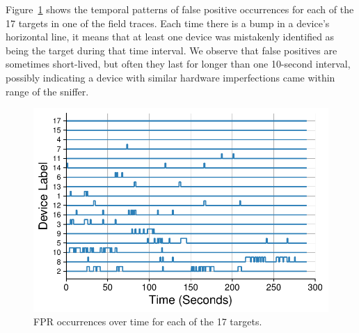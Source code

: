 Figure~\ref{fig:fpr_time} shows the temporal patterns of false positive
occurrences for each of the 17 targets in one of the field traces. Each time
there is a bump in a device's horizontal line, it means that at least one
device was mistakenly identified as being the target during that time interval.
We observe that false positives are sometimes short-lived, but often they last
for longer than one 10-second interval, possibly indicating a device with
similar hardware imperfections came within range of the
sniffer. 




\begin{figure}[t!]
    \centering
    \includegraphics[width = \linewidth]{bletracking/plots/fpr_time_10sec_sort2.pdf} 
    \caption{FPR occurrences over time for each of the 17 targets.}
    \label{fig:fpr_time}
\end{figure}











